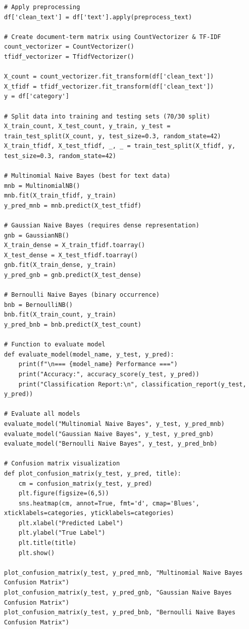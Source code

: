 \documentclass[a4paper,12pt]{article}
\begin{document}
\begin{lstlisting}[style=python]
# Apply preprocessing
df['clean_text'] = df['text'].apply(preprocess_text)

# Create document-term matrix using CountVectorizer & TF-IDF
count_vectorizer = CountVectorizer()
tfidf_vectorizer = TfidfVectorizer()

X_count = count_vectorizer.fit_transform(df['clean_text'])
X_tfidf = tfidf_vectorizer.fit_transform(df['clean_text'])
y = df['category']

# Split data into training and testing sets (70/30 split)
X_train_count, X_test_count, y_train, y_test = train_test_split(X_count, y, test_size=0.3, random_state=42)
X_train_tfidf, X_test_tfidf, _, _ = train_test_split(X_tfidf, y, test_size=0.3, random_state=42)

# Multinomial Naive Bayes (best for text data)
mnb = MultinomialNB()
mnb.fit(X_train_tfidf, y_train)
y_pred_mnb = mnb.predict(X_test_tfidf)

# Gaussian Naive Bayes (requires dense representation)
gnb = GaussianNB()
X_train_dense = X_train_tfidf.toarray()
X_test_dense = X_test_tfidf.toarray()
gnb.fit(X_train_dense, y_train)
y_pred_gnb = gnb.predict(X_test_dense)

# Bernoulli Naive Bayes (binary occurrence)
bnb = BernoulliNB()
bnb.fit(X_train_count, y_train)
y_pred_bnb = bnb.predict(X_test_count)

# Function to evaluate model
def evaluate_model(model_name, y_test, y_pred):
    print(f"\n=== {model_name} Performance ===")
    print("Accuracy:", accuracy_score(y_test, y_pred))
    print("Classification Report:\n", classification_report(y_test, y_pred))

# Evaluate all models
evaluate_model("Multinomial Naive Bayes", y_test, y_pred_mnb)
evaluate_model("Gaussian Naive Bayes", y_test, y_pred_gnb)
evaluate_model("Bernoulli Naive Bayes", y_test, y_pred_bnb)

# Confusion matrix visualization
def plot_confusion_matrix(y_test, y_pred, title):
    cm = confusion_matrix(y_test, y_pred)
    plt.figure(figsize=(6,5))
    sns.heatmap(cm, annot=True, fmt='d', cmap='Blues', xticklabels=categories, yticklabels=categories)
    plt.xlabel("Predicted Label")
    plt.ylabel("True Label")
    plt.title(title)
    plt.show()

plot_confusion_matrix(y_test, y_pred_mnb, "Multinomial Naive Bayes Confusion Matrix")
plot_confusion_matrix(y_test, y_pred_gnb, "Gaussian Naive Bayes Confusion Matrix")
plot_confusion_matrix(y_test, y_pred_bnb, "Bernoulli Naive Bayes Confusion Matrix")


\end{lstlisting}
\end{document}
